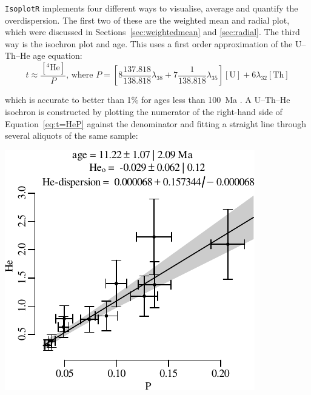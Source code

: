 \begin{refsection}
\texttt{IsoplotR} implements four different ways to visualise, average
and quantify the overdispersion.  The first two of these are the
weighted mean and radial plot, which were discussed in
Sections~\ref{sec:weightedmean} and \ref{sec:radial}. The third way is
the isochron plot and age. This uses a first order approximation of
the U--Th--He age equation:
\begin{equation}
  t \approx \frac{\left[{}^{4}\mbox{He}\right]}{P} \mbox{,~where~} P =
  \left[8 \frac{137.818}{138.818} \lambda_{38} + 7 \frac{1}{138.818}
    \lambda_{35} \right] [\mbox{U}] + 6 \lambda_{32} [\mbox{Th}]
    \label{eq:t=HeP}
\end{equation}

\noindent which is accurate to better than 1\% for ages less than
100~Ma \citep{vermeesch2008a}. A U--Th--He isochron is constructed by
plotting the numerator of the right-hand side of
Equation~\ref{eq:t=HeP} against the denominator and fitting a straight
line through several aliquots of the same sample:\\

\noindent\begin{minipage}[t]{.4\linewidth}
\strut\vspace*{-\baselineskip}\newline
\includegraphics[width=\textwidth]{../figures/UThHeisochron.pdf}\\
\end{minipage}
\begin{minipage}[t]{.6\linewidth}
  \label{fig:UThHeisochron}
\end{minipage}


\end{refsection}
